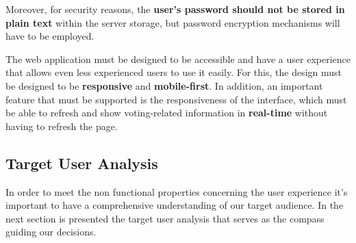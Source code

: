 \documentclass{scrartcl}
\begin{document}

Moreover, for security reasons, the \textbf{user's password should not be stored in plain text} within the server storage, but password encryption mechanisms will have to be employed.

The web application must be designed to be accessible and have a user experience that allows even less experienced users to use it easily. For this, the design must be designed to be \textbf{responsive} and \textbf{mobile-first}. In addition, an important feature that must be supported is the responsiveness of the interface, which must be able to refresh and show voting-related information in \textbf{real-time} without having to refresh the page.

\subsection{Target User Analysis}

In order to meet the non functional properties concerning the user experience it's important to have a comprehensive understanding of our target audience.
%
In the next section is presented the target user analysis that serves as the compass guiding our decisions.
\end{document}
